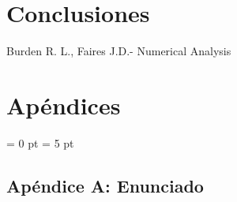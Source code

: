 \documentclass[a4paper]{article}
\begin{document}
\section{Conclusiones}

\begin{thebibliography}{abbrvnat}
 Burden R. L., Faires J.D.- Numerical Analysis
\end{thebibliography}


\section{Apéndices}


\parindent = 0 pt
\parskip = 5 pt

\addtolength{\topmargin}{-1cm}
\addtolength{\textheight}{1cm}

\newcommand{\real}{\mathbb{R}}
\newcommand{\kknn}{k}
\newcommand{\kpca}{\alpha}
\newcommand{\kkfold}{K}


\subsection*{Apéndice A: Enunciado}
\end{document}
